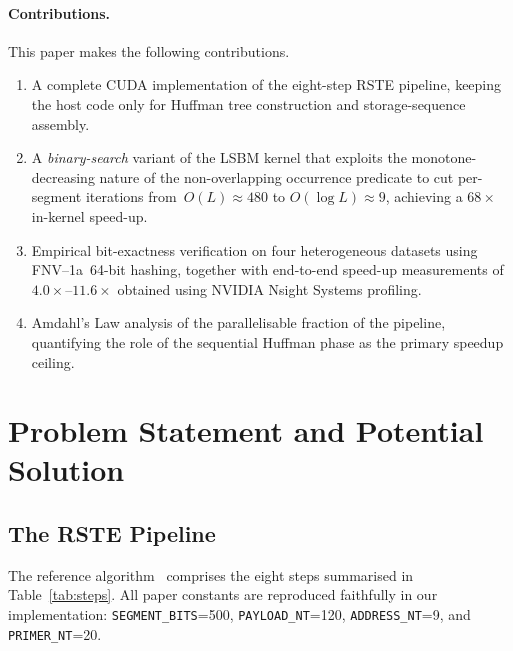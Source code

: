 \documentclass[runningheads]{llncs}
\begin{document}
\paragraph{Contributions.}
This paper makes the following contributions.
\begin{enumerate}
\item A complete CUDA implementation of the eight-step RSTE pipeline,
   keeping the host code only for Huffman tree construction and
   storage-sequence assembly.
\item A \emph{binary-search} variant of the LSBM kernel that exploits
   the monotone-decreasing nature of the non-overlapping occurrence
   predicate to cut per-segment iterations from~$O(L)\approx 480$ to
   $O(\log L)\approx 9$, achieving a $68\times$ in-kernel speed-up.
\item Empirical bit-exactness verification on four heterogeneous
   datasets using FNV--1a~64-bit hashing, together with end-to-end
   speed-up measurements of $4.0\times$--$11.6\times$ obtained using
   NVIDIA Nsight Systems profiling.
\item Amdahl's Law analysis of the parallelisable fraction of the
   pipeline, quantifying the role of the sequential Huffman phase as
   the primary speedup ceiling.
\end{enumerate}

\section{Problem Statement and Potential Solution}
\label{sec:problem}

\subsection{The RSTE Pipeline}
The reference algorithm~\cite{ref_rste} comprises the eight steps
summarised in Table~\ref{tab:steps}.  All paper constants are reproduced
faithfully in our implementation: \texttt{SEGMENT\_BITS}=500,
\texttt{PAYLOAD\_NT}=120, \texttt{ADDRESS\_NT}=9, and
\texttt{PRIMER\_NT}=20.
\end{document}
